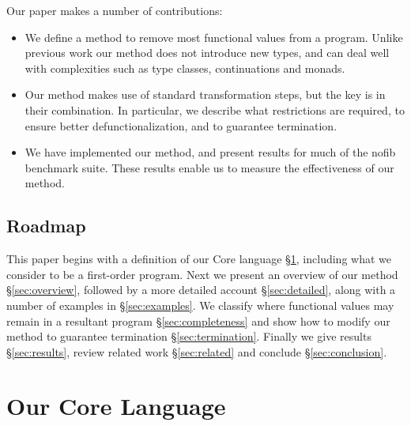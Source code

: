 \documentclass[preprint]{sigplanconf}
\begin{document}
Our paper makes a number of contributions:

\begin{itemize}
\item We define a method to remove most functional values from a program. Unlike previous work our method does not introduce new types, and can deal well with complexities such as type classes, continuations and monads.
\item Our method makes use of standard transformation steps, but the key is in their combination. In particular, we describe what restrictions are required, to ensure better defunctionalization, and to guarantee termination.
\item We have implemented our method, and present results for much of the nofib benchmark suite. These results enable us to measure the effectiveness of our method.
\end{itemize}

\subsection{Roadmap}

This paper begins with a definition of our Core language \S\ref{sec:core}, including what we consider to be a first-order program. Next we present an overview of our method \S\ref{sec:overview}, followed by a more detailed account \S\ref{sec:detailed}, along with a number of examples in \S\ref{sec:examples}. We classify where functional values may remain in a resultant program \S\ref{sec:completeness} and show how to modify our method to guarantee termination \S\ref{sec:termination}. Finally we give results \S\ref{sec:results}, review related work \S\ref{sec:related} and conclude \S\ref{sec:conclusion}.

\section{Our Core Language}
\label{sec:core}
\end{document}
